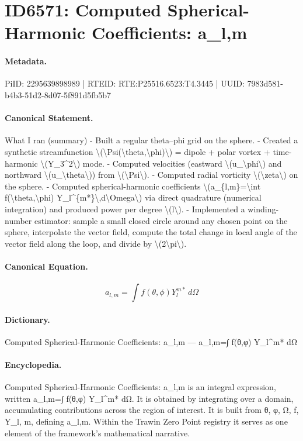 \section*{ID6571: Computed Spherical-Harmonic Coefficients: a\_l,m}
\paragraph{Metadata.}
PiID: 2295639898989 | RTEID: RTE:P25516.6523:T4.3445 | UUID: 7983d581-b4b3-51d2-8d07-5f891d5fb5b7

\paragraph{Canonical Statement.}
What I ran (summary) - Built a regular theta–phi grid on the sphere. - Created a synthetic streamfunction \textbackslash{}(\textbackslash{}Psi(\textbackslash{}theta,\textbackslash{}phi)\textbackslash{}) = dipole + polar vortex + time-harmonic \textbackslash{}(Y\_3\textasciicircum{}2\textbackslash{}) mode. - Computed velocities (eastward \textbackslash{}(u\_\textbackslash{}phi\textbackslash{}) and northward \textbackslash{}(u\_\textbackslash{}theta\textbackslash{})) from \textbackslash{}(\textbackslash{}Psi\textbackslash{}). - Computed radial vorticity \textbackslash{}(\textbackslash{}zeta\textbackslash{}) on the sphere. - Computed spherical-harmonic coefficients \textbackslash{}(a\_\{l,m\}=\textbackslash{}int f(\textbackslash{}theta,\textbackslash{}phi) Y\_l\textasciicircum{}\{m*\}\textbackslash{},d\textbackslash{}Omega\textbackslash{}) via direct quadrature (numerical integration) and produced power per degree \textbackslash{}(l\textbackslash{}). - Implemented a winding-number estimator: sample a small closed circle around any chosen point on the sphere, interpolate the vector field, compute the total change in local angle of the vector field along the loop, and divide by \textbackslash{}(2\textbackslash{}pi\textbackslash{}).

\paragraph{Canonical Equation.}
\[
a_{l,m}=\int f(\theta,\phi) Y_l^{m*}\,d\Omega
\]

\paragraph{Dictionary.}
Computed Spherical-Harmonic Coefficients: a\_l,m — a\_l,m=∫ f(θ,φ) Y\_l\textasciicircum{}m* dΩ

\paragraph{Encyclopedia.}
Computed Spherical-Harmonic Coefficients: a\_l,m is an integral expression, written a\_l,m=∫ f(θ,φ) Y\_l\textasciicircum{}m* dΩ. It is obtained by integrating over a domain, accumulating contributions across the region of interest. It is built from θ, φ, Ω, f, Y\_l, m, defining a\_l,m. Within the Trawin Zero Point registry it serves as one element of the framework's mathematical narrative.
